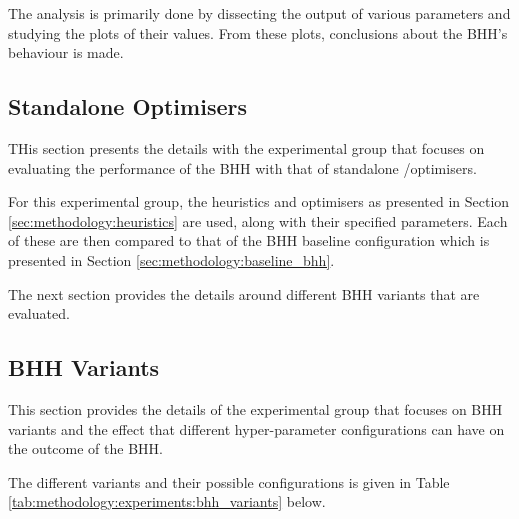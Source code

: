 The analysis is primarily done by dissecting the output of various parameters and studying the plots of their values. From these plots, conclusions about the \ac{BHH}'s behaviour is made.

\subsection{Standalone Optimisers}
\label{sec:methodology:experiments:standalone_optimisers}

THis section presents the details with the experimental group that focuses on evaluating the performance of the \ac{BHH} with that of standalone /optimisers.

For this experimental group, the heuristics and optimisers as presented in Section \ref{sec:methodology:heuristics} are used, along with their specified parameters. Each of these are then compared to that of the \ac{BHH} baseline configuration which is presented in Section \ref{sec:methodology:baseline_bhh}.

The next section provides the details around different \ac{BHH} variants that are evaluated.

\subsection{BHH Variants}
\label{sec:methodology:experiments:bhh_variants}

This section provides the details of the experimental group that focuses on \ac{BHH} variants and the effect that different hyper-parameter configurations can have on the outcome of the \ac{BHH}.

The different variants and their possible configurations is given in Table \ref{tab:methodology:experiments:bhh_variants} below.

